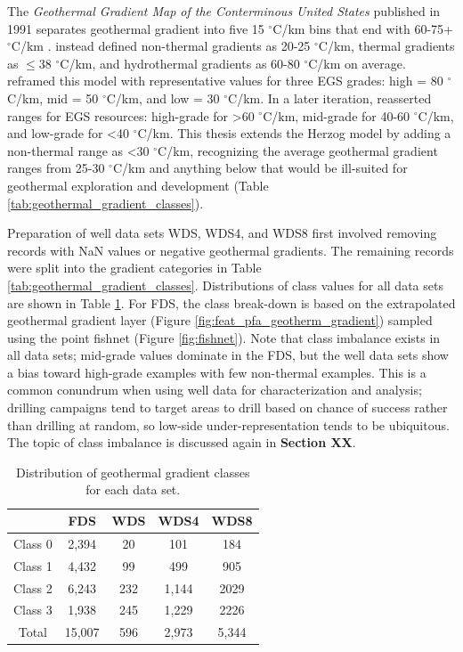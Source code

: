 The \textit{Geothermal Gradient Map of the Conterminous United States} published in 1991 separates geothermal gradient into five 15 $^\circ$C/km bins that end with 60-75+ $^\circ$C/km \citep{lanl_geothermal_1991}. \citet{armstead_heat_1987} instead defined non-thermal gradients as 20-25 $^\circ$C/km, thermal gradients as $\leq$38 $^\circ$C/km, and hydrothermal gradients as 60-80 $^\circ$C/km on average. \citet{tester_economic_1990} reframed this model with representative values for three EGS grades: high = 80 $^\circ$C/km, mid = 50 $^\circ$C/km, and low = 30 $^\circ$C/km. In a later iteration, \citet{herzog_economic_1997} reasserted ranges for EGS resources: high-grade for >60 $^\circ$C/km, mid-grade for 40-60 $^\circ$C/km, and low-grade for <40 $^\circ$C/km. This thesis extends the Herzog model by adding a non-thermal range as <30 $^\circ$C/km, recognizing the average geothermal gradient ranges from 25-30 $^\circ$C/km and anything below that would be ill-suited for geothermal exploration and development (Table \ref{tab:geothermal_gradient_classes}).

Preparation of well data sets WDS, WDS4, and WDS8 first involved removing records with NaN values or negative geothermal gradients. The remaining records were split into the gradient categories in Table \ref{tab:geothermal_gradient_classes}. Distributions of class values for all data sets are shown in Table \ref{tab:data_set_class_count}. For FDS, the class break-down is based on the extrapolated \citet{bielicki_hydrogeolgic_2015} geothermal gradient layer (Figure \ref{fig:feat_pfa_geotherm_gradient}) sampled using the point fishnet (Figure \ref{fig:fishnet}). Note that class imbalance exists in all data sets; mid-grade values dominate in the FDS, but the well data sets show a bias toward high-grade examples with few non-thermal examples. This is a common conundrum when using well data for characterization and analysis; drilling campaigns tend to target areas to drill based on chance of success rather than drilling at random, so low-side under-representation tends to be ubiquitous. The topic of class imbalance is discussed again in \textbf{Section XX}.  

\begin{table}[htp]
\centering
\begin{tabular}{c|c|c|c|c|}
\cline{2-5}
                              & FDS    & WDS & WDS4  & WDS8  \\ \hline
\multicolumn{1}{|c|}{Class 0} & 2,394  & 20  & 101   & 184   \\ \hline
\multicolumn{1}{|c|}{Class 1} & 4,432  & 99  & 499   & 905   \\ \hline
\multicolumn{1}{|c|}{Class 2} & 6,243  & 232 & 1,144 & 2029  \\ \hline
\multicolumn{1}{|c|}{Class 3} & 1,938  & 245 & 1,229 & 2226  \\ \hline
\multicolumn{1}{|c|}{Total}   & 15,007 & 596 & 2,973 & 5,344 \\ \hline
\end{tabular}
\caption[Data set class distribution]{Distribution of geothermal gradient classes for each data set.}
\label{tab:data_set_class_count}
\end{table}

